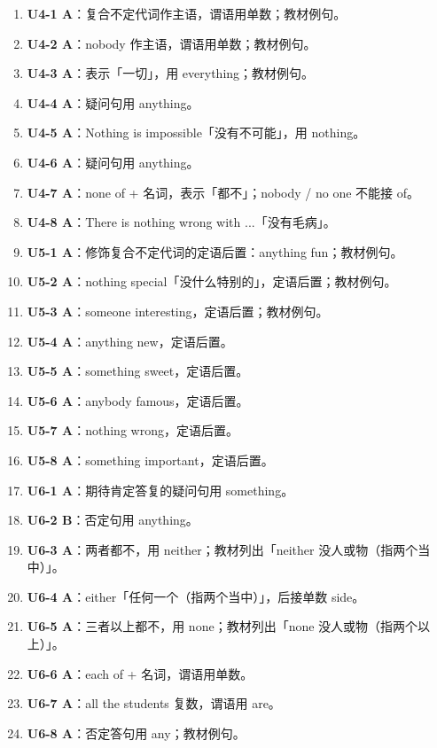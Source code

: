 \documentclass[11pt,a4paper]{ctexart}
\begin{document}
\begin{enumerate}[leftmargin=1.6em,itemsep=2pt]
\item \textbf{U4-1 A}：复合不定代词作主语，谓语用单数；教材例句。
\item \textbf{U4-2 A}：nobody 作主语，谓语用单数；教材例句。
\item \textbf{U4-3 A}：表示「一切」，用 everything；教材例句。
\item \textbf{U4-4 A}：疑问句用 anything。
\item \textbf{U4-5 A}：Nothing is impossible「没有不可能」，用 nothing。
\item \textbf{U4-6 A}：疑问句用 anything。
\item \textbf{U4-7 A}：none of + 名词，表示「都不」；nobody / no one 不能接 of。
\item \textbf{U4-8 A}：There is nothing wrong with ...「没有毛病」。
\item \textbf{U5-1 A}：修饰复合不定代词的定语后置：anything fun；教材例句。
\item \textbf{U5-2 A}：nothing special「没什么特别的」，定语后置；教材例句。
\item \textbf{U5-3 A}：someone interesting，定语后置；教材例句。
\item \textbf{U5-4 A}：anything new，定语后置。
\item \textbf{U5-5 A}：something sweet，定语后置。
\item \textbf{U5-6 A}：anybody famous，定语后置。
\item \textbf{U5-7 A}：nothing wrong，定语后置。
\item \textbf{U5-8 A}：something important，定语后置。
\item \textbf{U6-1 A}：期待肯定答复的疑问句用 something。
\item \textbf{U6-2 B}：否定句用 anything。
\item \textbf{U6-3 A}：两者都不，用 neither；教材列出「neither 没人或物（指两个当中）」。
\item \textbf{U6-4 A}：either「任何一个（指两个当中）」，后接单数 side。
\item \textbf{U6-5 A}：三者以上都不，用 none；教材列出「none 没人或物（指两个以上）」。
\item \textbf{U6-6 A}：each of + 名词，谓语用单数。
\item \textbf{U6-7 A}：all the students 复数，谓语用 are。
\item \textbf{U6-8 A}：否定答句用 any；教材例句。
\end{enumerate}
\end{document}
